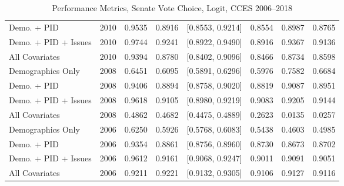 \begin{table}[ht]
\begin{tabular}{lrrrlrrr}
  Demo. + PID & 2010 & 0.9535 & 0.8916 & [0.8553, 0.9214] & 0.8554 & 0.8987 & 0.8765 \\ 
  Demo. + PID + Issues & 2010 & 0.9744 & 0.9241 & [0.8922, 0.9490] & 0.8916 & 0.9367 & 0.9136 \\ 
  All Covariates & 2010 & 0.9394 & 0.8780 & [0.8402, 0.9096] & 0.8466 & 0.8734 & 0.8598 \\ 
  Demographics Only & 2008 & 0.6451 & 0.6095 & [0.5891, 0.6296] & 0.5976 & 0.7582 & 0.6684 \\ 
  Demo. + PID & 2008 & 0.9406 & 0.8894 & [0.8758, 0.9020] & 0.8819 & 0.9087 & 0.8951 \\ 
  Demo. + PID + Issues & 2008 & 0.9618 & 0.9105 & [0.8980, 0.9219] & 0.9083 & 0.9205 & 0.9144 \\ 
  All Covariates & 2008 & 0.4862 & 0.4682 & [0.4475, 0.4889] & 0.2623 & 0.0135 & 0.0257 \\ 
  Demographics Only & 2006 & 0.6250 & 0.5926 & [0.5768, 0.6083] & 0.5438 & 0.4603 & 0.4985 \\ 
  Demo. + PID & 2006 & 0.9354 & 0.8861 & [0.8756, 0.8960] & 0.8730 & 0.8673 & 0.8702 \\ 
  Demo. + PID + Issues & 2006 & 0.9612 & 0.9161 & [0.9068, 0.9247] & 0.9011 & 0.9091 & 0.9051 \\ 
  All Covariates & 2006 & 0.9211 & 0.9221 & [0.9132, 0.9305] & 0.9106 & 0.9127 & 0.9116 \\ 
   \bottomrule
\end{tabular}
\caption{Performance Metrics, Senate Vote Choice, Logit, CCES 2006--2018} 
\label{tab:cces_senate_logit}
\end{table}
